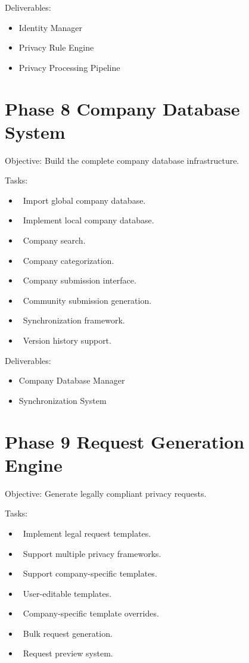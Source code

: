 Deliverables:
\begin{itemize}
	\item Identity Manager
	\item Privacy Rule Engine
	\item Privacy Processing Pipeline
\end{itemize}
\section{Phase 8 Company Database System}
Objective: Build the complete company database infrastructure.

Tasks:
\begin{itemize}
	\item[] \checkbox\ Import global company database.
	\item[] \checkbox\ Implement local company database.
	\item[] \checkbox\ Company search.
	\item[] \checkbox\ Company categorization.
	\item[] \checkbox\ Company submission interface.
	\item[] \checkbox\ Community submission generation.
	\item[] \checkbox\ Synchronization framework.
	\item[] \checkbox\ Version history support.
\end{itemize}

Deliverables:
\begin{itemize}
	\item Company Database Manager
	\item Synchronization System
\end{itemize}
\section{Phase 9 Request Generation Engine}
Objective: Generate legally compliant privacy requests.

Tasks:
\begin{itemize}
	\item[] \checkbox\ Implement legal request templates.
	\item[] \checkbox\ Support multiple privacy frameworks.
	\item[] \checkbox\ Support company-specific templates.
	\item[] \checkbox\ User-editable templates.
	\item[] \checkbox\ Company-specific template overrides.
	\item[] \checkbox\ Bulk request generation.
	\item[] \checkbox\ Request preview system.
\end{itemize}

